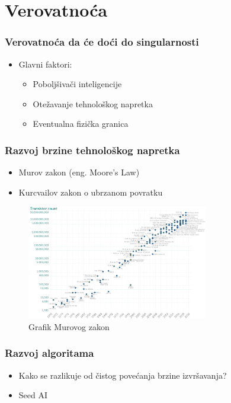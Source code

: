 \documentclass{beamer}
\begin{document}
\section{Verovatnoća}

\begin{frame}[fragile]\frametitle{Verovatnoća da će doći do singularnosti}
    \begin{itemize}	
        \item Glavni faktori:
        \begin{itemize}	
            \item Poboljšivači inteligencije
            \item Otežavanje tehnološkog napretka
            \item Eventualna fizička granica
      \end{itemize}
    \end{itemize}
\end{frame}

\begin{frame}[fragile]\frametitle{Razvoj brzine tehnološkog napretka}
    \begin{itemize}	
        \item Murov zakon (eng. Moore's Law)
        \item Kurcvailov zakon o ubrzanom povratku
    \end{itemize}
    \begin{figure}[h!]
        \centering\includegraphics[height=5cm]{moore.png} 
        \caption{Grafik Murovog zakon}
        \label{fig:murovzakon}
    \end{figure}
\end{frame}


\begin{frame}[fragile]\frametitle{Razvoj algoritama}
    \begin{itemize}	
        \item Kako se razlikuje od čistog povećanja brzine izvršavanja?
        \item Seed AI
    \end{itemize}
\end{frame}
\end{document}
